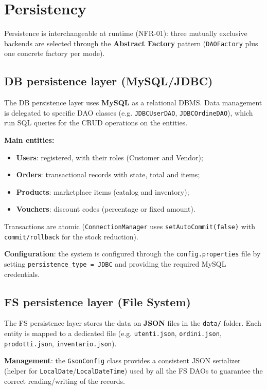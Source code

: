 \chapter{Persistency}
\label{cap:persistenza}

Persistence is interchangeable at runtime (NFR-01): three mutually exclusive
backends are selected through the \textbf{Abstract Factory} pattern
(\texttt{DAOFactory} plus one concrete factory per mode).

\section{DB persistence layer (MySQL/JDBC)}
The DB persistence layer uses \textbf{MySQL} as a relational DBMS. Data
management is delegated to specific DAO classes (e.g.
\texttt{JDBCUserDAO}, \texttt{JDBCOrdineDAO}), which run SQL queries for the
CRUD operations on the entities.

\textbf{Main entities:}
\begin{itemize}
    \item \textbf{Users}: registered, with their roles (Customer and Vendor);
    \item \textbf{Orders}: transactional records with state, total and items;
    \item \textbf{Products}: marketplace items (catalog and inventory);
    \item \textbf{Vouchers}: discount codes (percentage or fixed amount).
\end{itemize}

Transactions are atomic (\texttt{ConnectionManager} uses
\texttt{setAutoCommit(false)} with \texttt{commit/rollback} for the stock
reduction).

\textbf{Configuration}: the system is configured through the
\texttt{config.properties} file by setting \texttt{persistence\_type = JDBC} and
providing the required MySQL credentials.

\section{FS persistence layer (File System)}
The FS persistence layer stores the data on \textbf{JSON} files in the
\texttt{data/} folder. Each entity is mapped to a dedicated file
(e.g. \texttt{utenti.json}, \texttt{ordini.json}, \texttt{prodotti.json},
\texttt{inventario.json}).

\textbf{Management}: the \texttt{GsonConfig} class provides a consistent JSON
serializer (helper for \texttt{LocalDate}/\texttt{LocalDateTime}) used by all
the FS DAOs to guarantee the correct reading/writing of the records.

